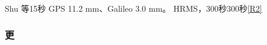 \documentclass[11pt,a4paper]{article}
\numberwithin{equation}{section}
\numberwithin{figure}{section}
\begin{document}
Shu {\cjkfont 等}\allowbreak{}15{\cjkfont 秒}\allowbreak{} GPS 11.2 mm{\cjkfont 、}\allowbreak{}Galileo 3.0 mm{\cjkfont 。}\allowbreak{} HRMS{\cjkfont ，}\allowbreak{}300{\cjkfont 秒}\allowbreak{}300{\cjkfont 秒}\allowbreak{}\hyperlink{ref-R2}{[R2]}

\subsubsection{{\cjkfont 更}\allowbreak{}}
\end{document}
